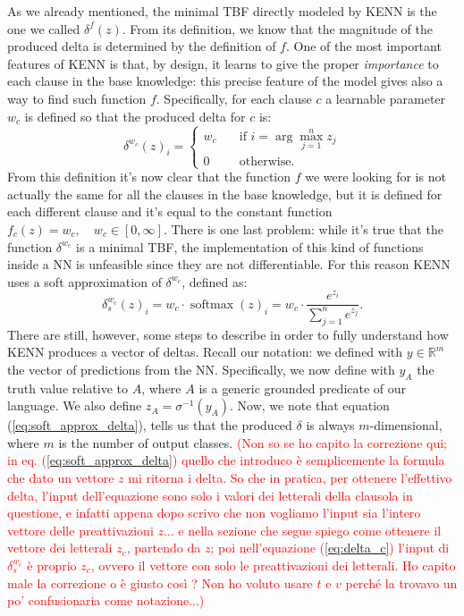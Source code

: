 As we already mentioned, the minimal TBF directly modeled by KENN is the one we called $\delta^f(z)$. From its definition, we know that the magnitude of the produced delta is determined by the definition of $f$. One of the most important features of KENN is that, by design, it learns to give the proper \textit{importance} to each clause in the base knowledge: this precise feature of the model gives also a way to find such function $f$. Specifically, for each clause $c$ a learnable parameter $w_c$ is defined so that the produced delta for $c$ is:
\begin{equation*}
\delta^{w_c}(z)_i = 
\begin{cases}
w_c \quad &\text{if } i = \arg\max_{j=1}^nz_j \\
0 \quad &\text{otherwise.}
\end{cases}
\end{equation*}
From this definition it's now clear that the function $f$ we were looking for is not actually the same for all the clauses in the base knowledge, but it is defined for each different clause and it's equal to the constant function $f_c(z) = w_c, \quad w_c \in \left[0, \infty\right]$. 
There is one last problem: while it's true that the function $\delta^{w_c}$ is a minimal TBF, the implementation of this kind of functions inside a NN is unfeasible since they are not differentiable. For this reason KENN uses a soft approximation of $\delta^{w_c}$, defined as:
\begin{equation}
\delta_s^{w_c}(z)_i = w_c \cdot \operatorname{softmax}(z)_i = w_c \cdot \frac{e^{z_i}}{\sum_{j=1}^ne^{z_j}}.
\label{eq:soft_approx_delta}
\end{equation}
There are still, however, some steps to describe in order to fully understand how KENN produces a vector of deltas. Recall our notation: we defined with $y \in \mathbb{R}^m$ the vector of predictions from the NN. Specifically, we now define with $y_A$ the truth value relative to $A$, where $A$ is a generic grounded predicate of our language. We also define $z_A=\sigma^{-1}(y_A)$. Now, we note that equation (\ref{eq:soft_approx_delta}), tells us that the produced $\delta$ is always $m$-dimensional, where $m$ is the number of output classes. 
\textcolor{red}{(Non so se ho capito la correzione qui; in eq. (\ref{eq:soft_approx_delta}) quello che introduco è semplicemente la formula che dato un vettore $z$ mi ritorna i delta. So che in pratica, per ottenere l'effettivo delta, l'input dell'equazione sono solo i valori dei letterali della clausola in questione, e infatti appena dopo scrivo che non vogliamo l'input sia l'intero vettore delle preattivazioni $z$... e nella sezione che segue spiego come ottenere il vettore dei letterali $z_c$, partendo da $z$; poi nell'equazione (\ref{eq:delta_c}) l'input di $\delta_s^{w_c}$ è proprio $z_c$, ovvero il vettore con solo le preattivazioni dei letterali. Ho capito male la correzione o è giusto così ? Non ho voluto usare $t$ e $v$ perché la trovavo un po' confusionaria come notazione...)}
